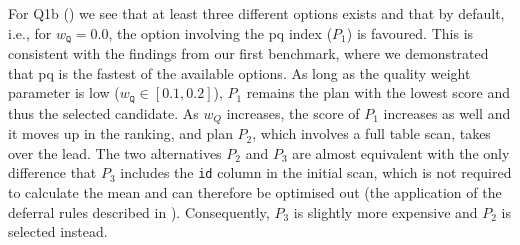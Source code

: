 For Q1b () we see that at least three different options exists and that by default, i.e., for $w_{\mathtt{Q}} = 0.0$, the option involving the \acrshort{pq} index ($P_1$) is favoured. This is consistent with the findings from our first benchmark, where we demonstrated that \acrshort{pq} is the fastest of the available options. As long as the quality weight parameter is low ($w_{\mathtt{Q}} \in [0.1, 0.2]$), $P_1$ remains the plan with the lowest score and thus the selected candidate. As $w_Q$ increases, the score of $P_1$ increases as well and it moves up in the ranking, and plan $P_2$, which involves a full table scan, takes over the lead. The two alternatives $P_2$ and $P_3$ are almost equivalent with the only difference that $P_3$ includes the \texttt{id} column in the initial scan, which is not required to calculate the mean and can therefore be optimised out (the application of the deferral rules described in ). Consequently, $P_3$ is slightly more expensive and $P_2$ is selected instead. 

